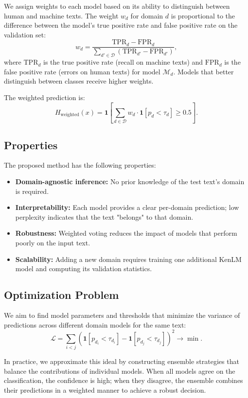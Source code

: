\documentclass{article}
\begin{document}
We assign weights to each model based on its ability to distinguish between human and machine texts. The weight $w_d$ for domain $d$ is proportional to the difference between the model's true positive rate and false positive rate on the validation set:
\[
w_d = \frac{\text{TPR}_d - \text{FPR}_d}{\sum_{d' \in \mathcal{D}} (\text{TPR}_{d'} - \text{FPR}_{d'})},
\]
where $\text{TPR}_d$ is the true positive rate (recall on machine texts) and $\text{FPR}_d$ is the false positive rate (errors on human texts) for model $\mathcal{M}_d$. Models that better distinguish between classes receive higher weights.

The weighted prediction is:
\[
H_{\text{weighted}}(x) = \mathbf{1}\left[ \sum_{d \in \mathcal{D}} w_d \cdot \mathbf{1}[p_d < \tau_d] \geq 0.5 \right].
\]

\subsection{Properties}

The proposed method has the following properties:

\begin{itemize}
    \item \textbf{Domain-agnostic inference:} No prior knowledge of the test text's domain is required.
    \item \textbf{Interpretability:} Each model provides a clear per-domain prediction; low perplexity indicates that the text "belongs" to that domain.
    \item \textbf{Robustness:} Weighted voting reduces the impact of models that perform poorly on the input text.
    \item \textbf{Scalability:} Adding a new domain requires training one additional KenLM model and computing its validation statistics.
\end{itemize}

\subsection{Optimization Problem}

We aim to find model parameters and thresholds that minimize the variance of predictions across different domain models for the same text:
\[
\mathcal{L} = \sum_{i < j} \left( \mathbf{1}[p_{d_i} < \tau_{d_i}] - \mathbf{1}[p_{d_j} < \tau_{d_j}] \right)^2 \rightarrow \min.
\]

In practice, we approximate this ideal by constructing ensemble strategies that balance the contributions of individual models. When all models agree on the classification, the confidence is high; when they disagree, the ensemble combines their predictions in a weighted manner to achieve a robust decision.
\end{document}
